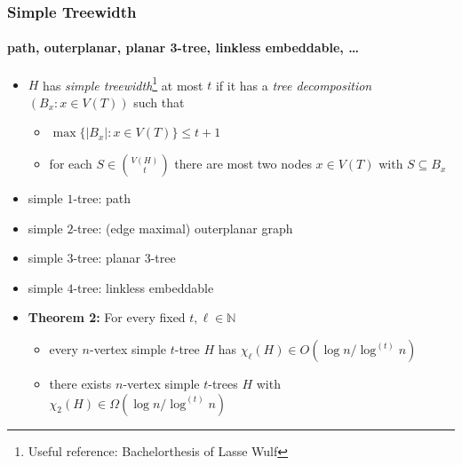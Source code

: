 \documentclass[xcolor=dvipsnames]{beamer}
\newcommand{\N}{\mathbb{N}}
\begin{document}
\begin{frame}
  \frametitle{Simple Treewidth}
  \framesubtitle{path, outerplanar, planar 3-tree, linkless embeddable, \ldots}
  
  \begin{itemize}[<+->]
    \item $H$ has \emph{simple treewidth}\footnote{Useful reference: Bachelorthesis of Lasse Wulf} at most $t$ if it has a \emph{tree decomposition} $(B_x:x\in V(T))$ such that
    \begin{itemize}
      \item $\max\{|B_x|:x\in V(T)\}\le t+1$
      \item for each $S\in \binom{V(H)}{t}$ there are most two nodes $x\in V(T)$ with $S\subseteq B_x$ 
    \end{itemize}
    \item simple $1$-tree: path
    \item simple $2$-tree: (edge maximal) outerplanar graph
    \item simple $3$-tree: planar $3$-tree
    \item simple $4$-tree: linkless embeddable 
    \item[]\textbf{Theorem 2:} For every fixed $t,\ell\in\N$ 
    \begin{itemize}
      \item every $n$-vertex simple $t$-tree $H$ has $\chi_\ell(H)\in O(\log n/\log^{(t)} n)$
      \item there exists $n$-vertex simple $t$-trees $H$ with $\chi_2(H)\in\Omega(\log n/\log^{(t)} n)$
    \end{itemize}
  \end{itemize}
\end{frame}
\end{document}
